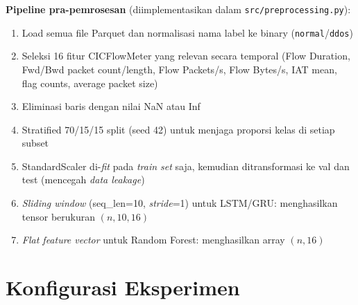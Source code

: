 \documentclass[11pt,a4paper,oneside]{report}
\begin{document}
\textbf{Pipeline pra-pemrosesan} (diimplementasikan dalam \texttt{src/preprocessing.py}):
\begin{enumerate}[leftmargin=*]
    \item Load semua file Parquet dan normalisasi nama label ke binary (\texttt{normal}/\texttt{ddos})
    \item Seleksi 16 fitur CICFlowMeter yang relevan secara temporal (Flow Duration, Fwd/Bwd packet count/length, Flow Packets/s, Flow Bytes/s, IAT mean, flag counts, average packet size)
    \item Eliminasi baris dengan nilai NaN atau Inf
    \item Stratified 70/15/15 split (seed 42) untuk menjaga proporsi kelas di setiap subset
    \item StandardScaler di-\textit{fit} pada \textit{train set} saja, kemudian ditransformasi ke val dan test (mencegah \textit{data leakage})
    \item \textit{Sliding window} (seq\_len=10, \textit{stride}=1) untuk LSTM/GRU: menghasilkan tensor berukuran $(n, 10, 16)$
    \item \textit{Flat feature vector} untuk Random Forest: menghasilkan array $(n, 16)$
\end{enumerate}

\section{Konfigurasi Eksperimen}
\end{document}
